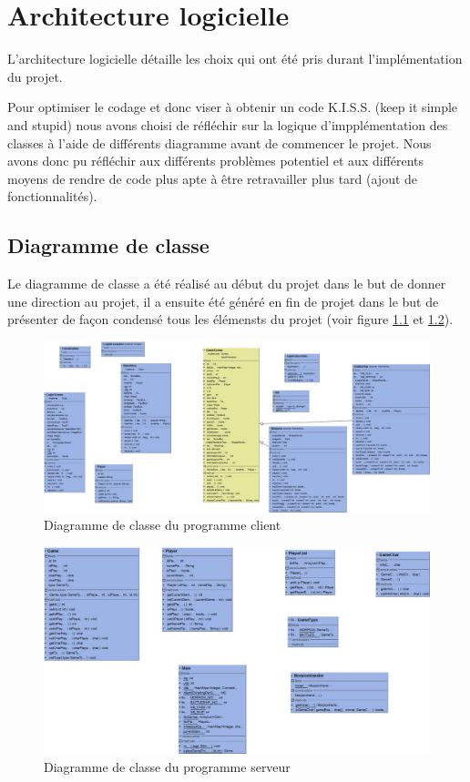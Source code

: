 \documentclass{report}
\begin{document}
\chapter{Architecture logicielle}
L'architecture logicielle détaille les choix qui ont été pris durant l'implémentation du projet.

Pour optimiser le codage et donc viser à obtenir un code K.I.S.S. (keep it simple and stupid) nous avons choisi de réfléchir sur la logique d'impplémentation
des classes à l'aide de différents diagramme avant de commencer le projet. Nous avons donc pu réfléchir
aux différents problèmes potentiel et aux différents moyens de rendre de code plus apte à être retravailler plus tard (ajout de fonctionnalités).

\section{Diagramme de classe}
Le diagramme de classe a été réalisé au début du projet dans le but de donner une direction au projet, il a ensuite été généré en fin de projet
dans le but de présenter de façon condensé tous les élémensts du projet (voir figure \ref{diagramme de classe client figure} et \ref{diagramme de classe serveur figure}).

\begin{figure}[H]
	\centering\includegraphics[width=15cm]{classdiagrammclient}
	\caption{Diagramme de classe du programme client}
  \label{diagramme de classe client figure}
\end{figure}

\begin{figure}[H]
	\centering\includegraphics[width=15cm]{classdiagrammserver}
	\caption{Diagramme de classe du programme serveur}
  \label{diagramme de classe serveur figure}
\end{figure}
\end{document}
